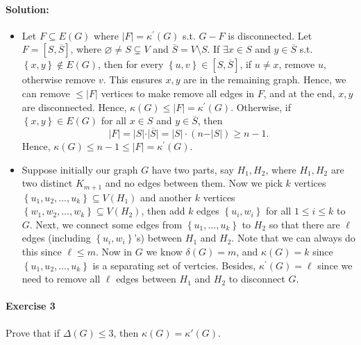 \documentclass[a4paper,12pt]{article}
\begin{document}
\paragraph{Solution:}
\begin{itemize}
	\item [(a)] Let \(F \subseteq E(G)\) where \(\vert F \vert = \kappa ^{\prime} (G) \) s.t. \(G - F\) is disconnected. Let \(F = [S, \overline{S}]\), where \(\varnothing \neq S \subsetneq V\) and \(\overline{S} = V \setminus S\). If \(\exists x \in S\) and \(y \in \overline{S}\) s.t. \(\left\{ x, y \right\} \notin E(G) \), then for every \(\left\{ u, v \right\} \in [S, \overline{S}] \), if \(u \neq x\), remove \(u\), otherwise remove \(v\). This ensures \(x, y\) are in the remaining graph.  Hence, we can remove \(\le \vert F \vert \) vertices to make remove all edges in \(F\), and at the end, \(x, y\) are disconnected. Hence, \(\kappa (G) \le \vert F \vert = \kappa ^{\prime} (G) \). Otherwise, if \(\left\{ x, y \right\} \in E(G) \) for all \(x \in S\) and \(y \in \overline{S}\), then
    \[
        \vert F \vert = \vert S \vert \cdot \vert \overline{S} \vert = \vert S \vert \cdot (n - \vert S \vert ) \ge n - 1. 
    \]                
    Hence, \(\kappa (G) \le n - 1 \le \vert F \vert = \kappa ^{\prime} (G) \).
	\item [(b)] Suppose initially our graph \(G\) have two parts, say \(H_1, H_2\), where \(H_1, H_2\) are two distinct \(K_{m+1}\) and no edges between them. Now we pick \(k\) vertices \(\left\{ u_1, u_2, \dots , u_k \right\} \subseteq V(H_1) \) and another \(k\) vertices \(\left\{ w_1, w_2, \dots , w_k \right\} \subseteq V(H_2) \), then add \(k\) edges \(\left\{ u_i, w_i \right\}  \) for all \(1 \le i \le k\) to \(G\). Next, we connect some edges from \(\left\{ u_1, \dots , u_k \right\} \) to \(H_2\) so that there are \(\ell\) edges (including \(\left\{ u_i, w_i  \right\} \)'s) between \(H_1\) and \(H_2\). Note that we can always do this since \(\ell \le m\). Now in \(G\) we know \(\delta (G) = m\), and \(\kappa (G) = k\) since \(\left\{ u_1, u_2, \dots , u_k \right\} \) is a separating set of vertcies. Besides, \(\kappa ^{\prime} (G) = \ell \) since we need to remove all \(\ell \) edges between \(H_1\) and \(H_2\) to disconnect \(G\).                
\end{itemize}

\paragraph{Exercise 3}  Prove that if $\Delta(G) \le 3$, then $\kappa(G) = \kappa'(G)$.
\end{document}
